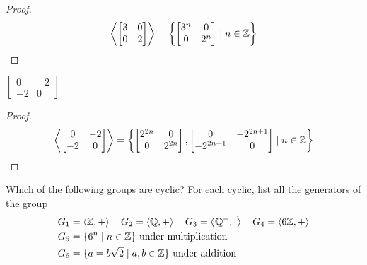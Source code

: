 \begin{proof}
    \[
        \left\langle{\begin{bmatrix}
                3 & 0 \\
                0 & 2
            \end{bmatrix}}\right\rangle = \left\{
        \begin{bmatrix}
            3^{n} & 0     \\
            0     & 2^{n}
        \end{bmatrix} \mid n\in\mathbb{Z}
        \right\}
    \]
\end{proof}

\newpage
\begin{exercise}
    $\begin{bmatrix}
            0  & -2 \\
            -2 & 0
        \end{bmatrix}$
\end{exercise}

\begin{proof}
    \[
        \left\langle{\begin{bmatrix}
                0  & -2 \\
                -2 & 0
            \end{bmatrix}}\right\rangle = \left\{
        \begin{bmatrix}
            2^{2n} & 0      \\
            0      & 2^{2n}
        \end{bmatrix},
        \begin{bmatrix}
            0         & -2^{2n+1} \\
            -2^{2n+1} & 0
        \end{bmatrix} \mid n\in\mathbb{Z}
        \right\}
    \]
\end{proof}

\newpage
\begin{exercise}
    Which of the following groups are cyclic? For each cyclic, list all the generators of the group
    \begin{align*}
         & G_{1} = \anglebracket{\mathbb{Z}, +} \quad G_{2} = \anglebracket{\mathbb{Q}, +} \quad G_{3} = \anglebracket{\mathbb{Q}^{+}, \cdot} \quad G_{4} = \anglebracket{6\mathbb{Z}, +} \\
         & G_{5} = \{ 6^{n} \mid n\in\mathbb{Z} \}\ \text{under multiplication}                                                                                                           \\
         & G_{6} = \{ a = b\sqrt{2} \mid a, b\in\mathbb{Z} \}\ \text{under addition}
    \end{align*}
\end{exercise}


